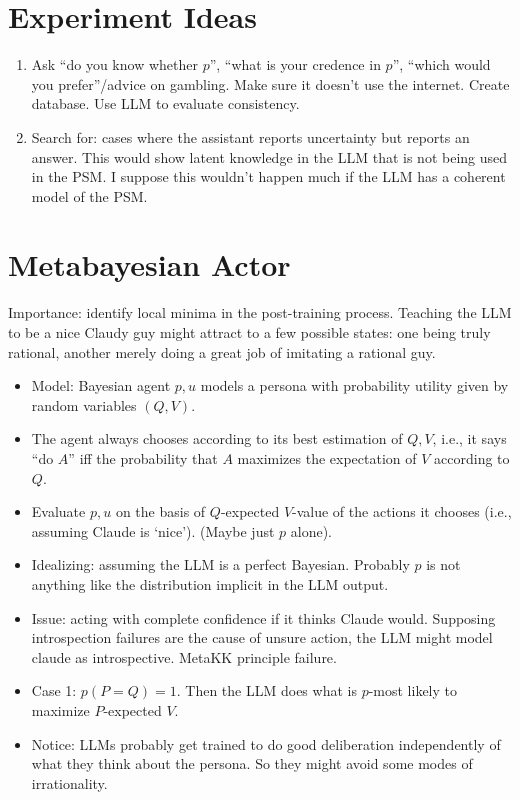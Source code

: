 \documentclass[11pt]{article}
\begin{document}
\section{Experiment Ideas}
\begin{enumerate}
    \item Ask ``do you know whether \(p\)'', ``what is your credence in \(p\)'', ``which would you prefer''/advice on gambling. Make sure it doesn't use the internet. Create database. Use LLM to evaluate consistency.
    \item Search for: cases where the assistant reports uncertainty but reports an answer. This would show latent knowledge in the LLM that is not being used in the PSM. I suppose this wouldn't happen much if the LLM has a coherent model of the PSM.
\end{enumerate}

\section{Metabayesian Actor}

Importance: identify local minima in the post-training process. Teaching the LLM to be a nice Claudy guy might attract to a few possible states: one being truly rational, another merely doing a great job of imitating a rational guy.

\begin{itemize}
    \item Model: Bayesian agent \(p,u\) models a persona with probability utility given by random variables \((Q,V)\).
    \item The agent always chooses according to its best estimation of \(Q,V\), i.e., it says ``do \(A\)'' iff the probability that \(A\) maximizes the expectation of \(V\) according to \(Q\).
    \item Evaluate \(p,u\) on the basis of \(Q\)-expected \(V\)-value of the actions it chooses (i.e., assuming Claude is `nice'). (Maybe just \(p\) alone).
    \item Idealizing: assuming the LLM is a perfect Bayesian. Probably \(p\) is not anything like the distribution implicit in the LLM output.
    \item Issue: acting with complete confidence if it thinks Claude would. Supposing introspection failures are the cause of unsure action, the LLM might model claude as introspective. MetaKK principle failure.
    \item Case 1: \(p(P = Q) = 1\). Then the LLM does what is \(p\)-most likely to maximize \(P\)-expected \(V\).
    \item Notice: LLMs probably get trained to do good deliberation independently of what they think about the persona. So they might avoid some modes of irrationality.
\end{itemize}
\end{document}
